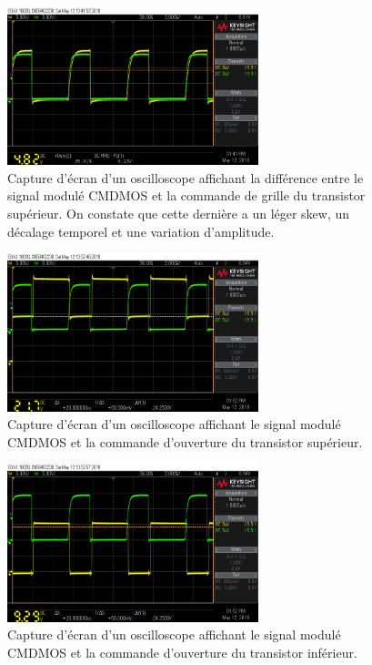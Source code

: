 \documentclass[10pt, oneside, a4paper]{article}
\begin{document}
\begin{figure}[p]
    \centering
    \includegraphics[width=0.65\textwidth]{image/12-05/scope_5.png}
    \caption{Capture d'écran d'un oscilloscope affichant la différence entre le signal
             modulé CMDMOS et la commande de grille du transistor supérieur.
             On constate que cette dernière a un léger \og{}skew\fg{}, un décalage
             temporel et une variation d'amplitude.}
    \label{fig:scope-5}
\end{figure}

\begin{figure}[p]
    \centering
    \includegraphics[width=0.65\textwidth]{image/12-05/scope_7.png}
    \caption{Capture d'écran d'un oscilloscope affichant le signal modulé CMDMOS et la
             commande d'ouverture du transistor supérieur.}
    \label{fig:scope-7}
\end{figure}

\begin{figure}[p]
    \centering
    \includegraphics[width=0.65\textwidth]{image/12-05/scope_8.png}
    \caption{Capture d'écran d'un oscilloscope affichant le signal modulé CMDMOS et la
             commande d'ouverture du transistor inférieur.}
    \label{fig:scope-8}
\end{figure}
\end{document}
